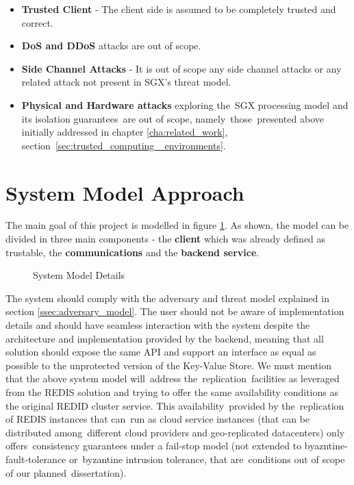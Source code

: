 \begin{itemize}
	\item \textbf{Trusted Client} - The client side is assumed to be completely trusted and correct.
	\item \textbf{\gls{DoS} and \gls{DDoS}} attacks are out of scope.
	\item \textbf{Side Channel Attacks} - It is out of scope any side channel attacks or any related attack not present in \gls{SGX}'s threat model.
	\item \textbf{Physical and Hardware attacks} exploring the \gls{SGX} processing model and its isolation guarantees are out of scope, namely those presented above initially addressed in chapter \ref{cha:related_work}, section \ref{sec:trusted_computing _environments}.
\end{itemize}

\section{System Model Approach} %
\label{sec:system_model_approach}

The main goal of this project is modelled in figure \ref{fig:syste_model_detailed}. As shown, the model can be divided in three main components - the \textbf{client} which was already defined as trustable, the \textbf{communications} and the \textbf{backend service}. 

\begin{figure}[htbp]
  \caption{System Model Details}
  \label{fig:syste_model_detailed}
\end{figure}

The system should comply with the adversary and threat model explained in section \ref{ssec:adversary_model}. The user should not be aware of implementation details and should have seamless interaction with the system despite the architecture and implementation provided by the backend, meaning that all solution should expose the same \gls{API} and support an interface as equal as possible to the unprotected version of the Key-Value Store. We must mention that the above system model will address the replication facilities as leveraged from the REDIS solution and trying to offer the same availability conditions as the original REDID cluster service. This availability provided by the replication of REDIS instances that can run as cloud service instances (that can be distributed among different cloud providers and geo-replicated datacenters) only offers consistency guarantees under a fail-stop model (not extended to byazntine-fault-tolerance or byzantine intrusion tolerance, that are conditions out of scope of our planned dissertation).

